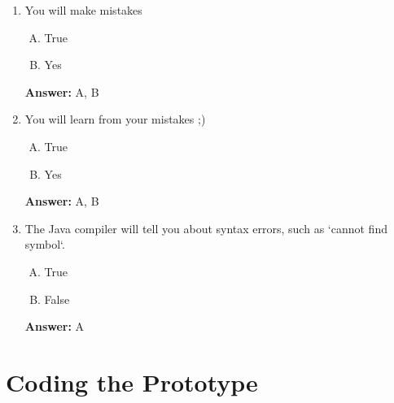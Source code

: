 \documentclass[12pt]{article}
\begin{document}
\bigskip

\begin{enumerate}[1.]
    \item

    You will make mistakes

    \bigskip

    \begin{enumerate}[A.]
        \item True
        \item Yes
    \end{enumerate}

    \bigskip

    \textbf{Answer:} A, B

    \item

    You will learn from your mistakes ;)

    \bigskip

    \begin{enumerate}[A.]
        \item True
        \item Yes
    \end{enumerate}

    \bigskip

    \textbf{Answer:} A, B

    \item The Java compiler will tell you about syntax errors, such as `cannot
    find symbol`.

    \bigskip

    \begin{enumerate}[A.]
        \item True
        \item False
    \end{enumerate}

    \bigskip

    \textbf{Answer:} A

\end{enumerate}

\section{Coding the Prototype}

\bigskip
\end{document}

